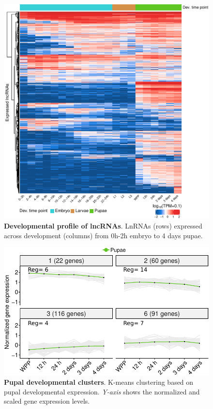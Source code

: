 \begin{figure}[ht!]
  \centering
  \includegraphics[scale=0.5]{plots/appendix/dme/all.lncRNA.exp.dev.pdf}
  \caption[Developmental profile of lncRNAs]{\textbf{Developmental profile of lncRNAs}. LnRNAs (rows) expressed across development (columns) from 0h-2h embryo to 4 days pupae.}
  \label{fig:heatmap-modencode-dev-all}
\end{figure}

\begin{figure}[ht!]
  \centering
  \includegraphics[scale=0.75]{plots/appendix/dme/puape.supp.clusters.pdf}
  \caption[Pupal developmental clusters]{\textbf{Pupal developmental clusters}. K-means clustering based on pupal developmental expression. \textit{Y-axis} shows the normalized and scaled gene expression levels.}
  \label{supp-fig:pupae-clustering}
\end{figure}


